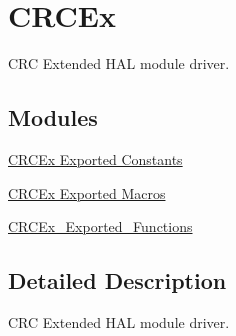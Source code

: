 \hypertarget{group___c_r_c_ex}{}\section{C\+R\+C\+Ex}
\label{group___c_r_c_ex}


C\+RC Extended H\+AL module driver.  


\subsection*{Modules}
\begin{DoxyCompactItemize}
\item 
\hyperlink{group___c_r_c_ex___exported___constants}{C\+R\+C\+Ex Exported Constants}
\item 
\hyperlink{group___c_r_c_ex___exported___macros}{C\+R\+C\+Ex Exported Macros}
\item 
\hyperlink{group___c_r_c_ex___exported___functions}{C\+R\+C\+Ex\+\_\+\+Exported\+\_\+\+Functions}
\end{DoxyCompactItemize}


\subsection{Detailed Description}
C\+RC Extended H\+AL module driver. 

